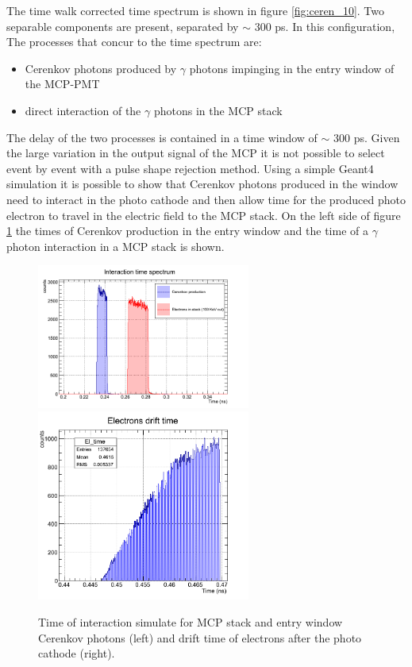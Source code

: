 The time walk corrected time spectrum is shown in figure \ref{fig:ceren_10}. Two separable components are present, separated by $\sim$ 300 ps. %
In this configuration, The processes that concur to the time spectrum are:
\begin{itemize}
\item Cerenkov photons produced by $\gamma$ photons impinging in the entry window of the MCP-PMT
\item direct interaction of the $\gamma$ photons in the MCP stack
\end{itemize}
The delay of the two processes is contained in a time window of $\sim$ 300 ps.
Given the large variation in the output signal of the MCP it is not possible to select event by event with a pulse shape rejection method.
Using a simple Geant4 simulation it is possible to show that Cerenkov photons produced in the window need to interact in the photo cathode and then allow time for the produced photo electron to travel in the electric field to the MCP stack. On the left side of figure \ref{fig:drift} the times of Cerenkov production in the entry window and the time of a $\gamma$ photon interaction in a MCP stack is shown.
\begin{figure}[htbp]
\begin{center}
\includegraphics[width=7cm]{../Pictures/Chapter_8/interaction_time_spectrum.png}
\includegraphics[width=7cm]{../Pictures/Chapter_8/electron_drift.png}
\end{center}
\caption[Stack and Cerenkov simulation]{Time of interaction simulate for MCP stack and entry window Cerenkov photons (left) and drift time of electrons after the photo cathode (right). }
\label{fig:drift}
\end{figure}
